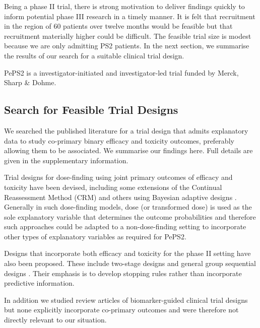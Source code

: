 \documentclass[alpha-refs]{wiley-article}
\begin{document}
Being a phase II trial, there is strong motivation to deliver findings quickly to inform potential phase III research in a timely manner.
It is felt that recruitment in the region of 60 patients over twelve months would be feasible but that recruitment materially higher could be difficult. 
The feasible trial size is modest because we are only admitting PS2 patients.
In the next section, we summarise the results of our search for a suitable clinical trial design.

PePS2 is a investigator-initiated and investigator-led trial funded by Merck, Sharp \& Dohme.

\subsection{Search for Feasible Trial Designs}
We searched the published literature for a trial design that admits explanatory data to study co-primary binary efficacy and toxicity outcomes, preferably allowing them to be associated. 
We summarise our findings here.
Full details are given in the supplementary information.

Trial designs for dose-finding using joint primary outcomes of efficacy and toxicity have been devised, including some extensions of the \cite{OQuigley1990} Continual Reassessment Method (CRM) \citep{Braun2002,Zhang2006, Mandrekar2010} and others using Bayesian adaptive designs \citep{Thall2004, Cook2006, Thall2014, Wages2014}.
Generally in such dose-finding models, dose (or transformed dose) is used as the sole explanatory variable that determines the outcome probabilities and therefore such approaches could be adapted to a non-dose-finding setting to incorporate other types of explanatory variables as required for PePS2. 

Designs that incorporate both efficacy and toxicity for the phase II setting have also been proposed. 
These include two-stage designs \citep{Jin2007, Brutti2011} and general group sequential designs \citep{Cook1994, Conaway1995, Conaway1996}.
Their emphasis is to develop stopping rules rather than incorporate predictive information.

In addition we studied review articles of biomarker-guided clinical trial designs \citep{Freidlin2010, Buyse2011, Antoniou2016} but none explicitly incorporate co-primary outcomes and were therefore not directly relevant to our situation. 
\end{document}
